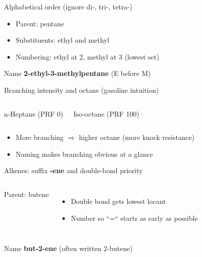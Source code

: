 \documentclass[aspectratio=169]{beamer}
\begin{document}
\begin{frame}{Alphabetical order (ignore di-, tri-, tetra-)}
\centering
{}

\vspace{2mm}
\begin{itemize}
\item Parent: pentane
\item Substituents: ethyl and methyl
\item Numbering: ethyl at 2, methyl at 3 (lowest set)
\end{itemize}

\begin{block}{Name}
\textbf{2-ethyl-3-methylpentane} (E before M)
\end{block}
\end{frame}

\begin{frame}{Branching intensity and octane (gasoline intuition)}

\begin{columns}[T,onlytextwidth]
\begin{block}{n-Heptane (PRF 0)}
\centering
{}
\end{block}

\begin{block}{Iso-octane (PRF 100)}
\centering
{}
\end{block}
\end{columns}

\begin{itemize}
\item More branching \(\Rightarrow\) higher octane (more knock resistance)
\item Naming makes branching obvious at a glance
\end{itemize}

\end{frame}

\begin{frame}{Alkenes: suffix \textbf{-ene} and double-bond priority}
\begin{columns}[T,onlytextwidth]
\centering
{}

\vspace{1mm}
Parent: butene

\begin{itemize}
\item Double bond gets lowest locant
\item Number so “=“ starts as early as possible
\end{itemize}
\end{columns}

\begin{block}{Name}
\textbf{but-2-ene} (often written 2-butene)
\end{block}
\end{frame}
\end{document}
